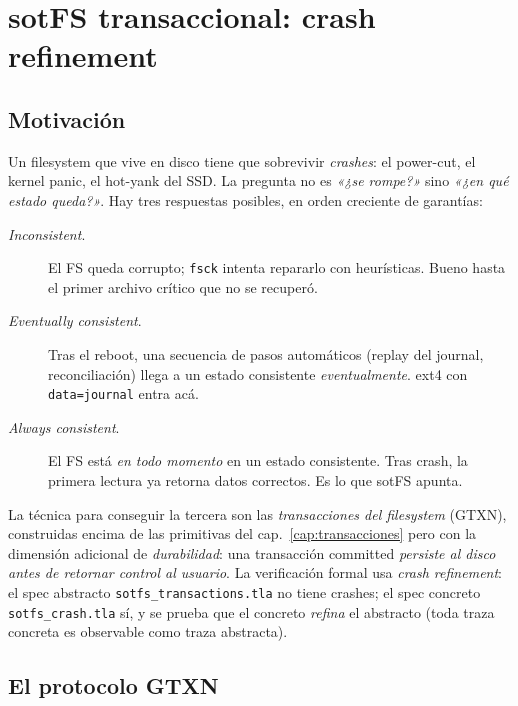 \chapter{sotFS transaccional: crash refinement}
\label{cap:sotfs-tx}

\section{Motivación}

Un filesystem que vive en disco tiene que sobrevivir
\emph{crashes}: el power-cut, el kernel panic, el hot-yank del
SSD. La pregunta no es \emph{«¿se rompe?»} sino \emph{«¿en qué
estado queda?»}. Hay tres respuestas posibles, en orden creciente
de garantías:

\begin{description}
  \item[\emph{Inconsistent}.] El FS queda corrupto; \texttt{fsck}
    intenta repararlo con heurísticas. Bueno hasta el primer
    archivo crítico que no se recuperó.
  \item[\emph{Eventually consistent}.] Tras el reboot, una
    secuencia de pasos automáticos (replay del journal,
    reconciliación) llega a un estado consistente \emph{eventualmente}.
    ext4 con \texttt{data=journal} entra acá.
  \item[\emph{Always consistent}.] El FS está \emph{en todo
    momento} en un estado consistente. Tras crash, la primera
    lectura ya retorna datos correctos. Es lo que sotFS apunta.
\end{description}

La técnica para conseguir la tercera son las \emph{transacciones
del filesystem} (GTXN), construidas encima de las primitivas
del cap.~\ref{cap:transacciones} pero con la dimensión adicional
de \emph{durabilidad}: una transacción committed \emph{persiste
al disco antes de retornar control al usuario}. La verificación
formal usa \emph{crash refinement}: el spec abstracto
\texttt{sotfs\_transactions.tla} no tiene crashes; el spec
concreto \texttt{sotfs\_crash.tla} sí, y se prueba que el
concreto \emph{refina} el abstracto (toda traza concreta es
observable como traza abstracta).

\section{El protocolo GTXN}

